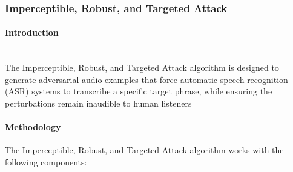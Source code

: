 \documentclass[../main.tex]{subfiles}
\begin{document}
\subsubsection{Imperceptible, Robust, and Targeted Attack}
\paragraph{Introduction}\leavevmode\\
The Imperceptible, Robust, and Targeted Attack algorithm\cite{qin2019imperceptible} is designed to generate adversarial audio examples that force automatic speech recognition (ASR) systems to transcribe a specific target phrase, while ensuring the perturbations remain inaudible to human listeners

\paragraph{Methodology}
The Imperceptible, Robust, and Targeted Attack algorithm works with the following components:
\end{document}

